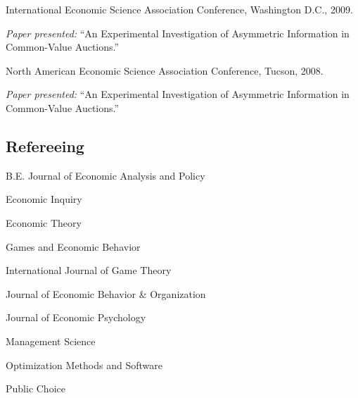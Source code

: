 \documentclass{article}%
\renewenvironment{itemize}{
\begin{list}{}{
\setlength{\leftmargin}{1.5em}
}
}{
\end{list}
}
\begin{document}
\begin{itemize}
\item International Economic Science Association Conference, Washington D.C., 2009.
\begin{itemize}\vspace{-.24cm}
\item \textit{Paper presented:} ``An Experimental Investigation of Asymmetric Information in Common-Value
Auctions.''
\end{itemize}

\item North American Economic Science Association Conference, Tucson, 2008.
\begin{itemize}\vspace{-.24cm}
\item \textit{Paper presented:} ``An Experimental
Investigation of Asymmetric Information in Common-Value Auctions.''
\end{itemize}
\end{itemize}


\subsection*{Refereeing}

\begin{itemize}
\item B.E. Journal of Economic Analysis and Policy
\item Economic Inquiry
\item Economic Theory
\item Games and Economic Behavior
\item International Journal of Game Theory
\item Journal of Economic Behavior \& Organization
\item Journal of Economic Psychology
\item Management Science
\item Optimization Methods and Software
\item Public Choice
\end{itemize}
\newpage
\clearpage
\end{document}
